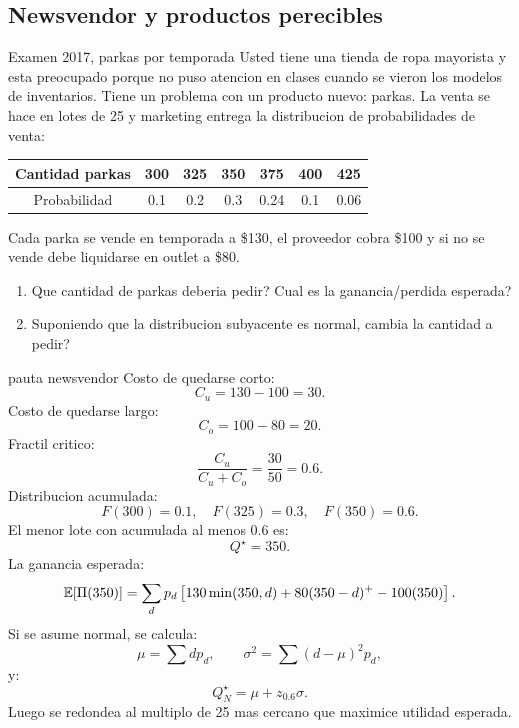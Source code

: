 \subsection{Newsvendor y productos perecibles}

\begin{enunciado}{Examen 2017, parkas por temporada}
Usted tiene una tienda de ropa mayorista y esta preocupado porque no puso atencion en clases cuando se vieron los modelos de inventarios. Tiene un problema con un producto nuevo: parkas. La venta se hace en lotes de 25 y marketing entrega la distribucion de probabilidades de venta:

\begin{center}
\begin{tabular}{c|cccccc}
\toprule
Cantidad parkas & 300 & 325 & 350 & 375 & 400 & 425\\
\midrule
Probabilidad & 0.1 & 0.2 & 0.3 & 0.24 & 0.1 & 0.06\\
\bottomrule
\end{tabular}
\end{center}

Cada parka se vende en temporada a \$130, el proveedor cobra \$100 y si no se vende debe liquidarse en outlet a \$80.

\begin{enumerate}[label=\alph*)]
  \item Que cantidad de parkas deberia pedir? Cual es la ganancia/perdida esperada?
  \item Suponiendo que la distribucion subyacente es normal, cambia la cantidad a pedir?
\end{enumerate}
\end{enunciado}

\begin{pautacompleta}{pauta newsvendor}
Costo de quedarse corto:
\[
  C_u=130-100=30.
\]
Costo de quedarse largo:
\[
  C_o=100-80=20.
\]
Fractil critico:
\[
  \frac{C_u}{C_u+C_o}=\frac{30}{50}=0.6.
\]
Distribucion acumulada:
\[
  F(300)=0.1,\quad F(325)=0.3,\quad F(350)=0.6.
\]
El menor lote con acumulada al menos 0.6 es:
\[
  Q^\star=350.
\]
La ganancia esperada:
\[
  \mathbb{E}[\Pi(350)]=
  \sum_d p_d\left[130\min(350,d)+80(350-d)^+-100(350)\right].
\]
Si se asume normal, se calcula:
\[
  \mu=\sum d p_d,\qquad \sigma^2=\sum(d-\mu)^2p_d,
\]
y:
\[
  Q_N^\star=\mu+z_{0.6}\sigma.
\]
Luego se redondea al multiplo de 25 mas cercano que maximice utilidad esperada.
\end{pautacompleta}

